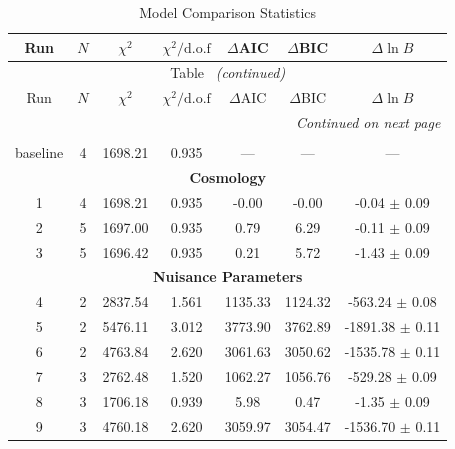 \clearpage
\onecolumngrid
\begin{longtable}{c c c c c c c}
    \caption{Model Comparison Statistics} \label{tab:bic} \\
    \hline
    \hline
    Run & $N$ & $\chi^2$ & $\chi^2/\mathrm{d.o.f}$ & $\Delta$AIC & $\Delta$BIC & $\Delta\ln B$ \\
    \hline
    \hline
    \endfirsthead
    \multicolumn{7}{c}{Table~\thetable{} \emph{(continued)}} \\
    \hline
    \hline
    Run & $N$ & $\chi^2$ & $\chi^2/\mathrm{d.o.f}$ & $\Delta$AIC & $\Delta$BIC & $\Delta\ln B$ \\
    \hline
    \hline
    \endhead
    \hline
    \multicolumn{7}{r}{\emph{Continued on next page}} \\
    \endfoot
    \hline
    \endlastfoot
    \multicolumn{7}{c}{\textbf{Baseline}} \\
    \hline
    baseline & 4 & 1698.21 & 0.935 & --- & --- & --- \\
    \hline
    \multicolumn{7}{c}{\textbf{Cosmology}} \\
    \hline
    1 & 4 & 1698.21 & 0.935 & -0.00 & -0.00 & -0.04 $\pm$ 0.09 \\
    2 & 5 & 1697.00 & 0.935 & 0.79 & \cellcolor{aiclightred}6.29 & -0.11 $\pm$ 0.09 \\
    3 & 5 & 1696.42 & 0.935 & 0.21 & \cellcolor{aicorange}5.72 & \cellcolor{aicorange}-1.43 $\pm$ 0.09 \\
    \hline
    \multicolumn{7}{c}{\textbf{Nuisance Parameters}} \\
    \hline
    4 & 2 & 2837.54 & 1.561 & \cellcolor{aicred}1135.33 & \cellcolor{aicred}1124.32 & \cellcolor{aicred}-563.24 $\pm$ 0.08 \\
    5 & 2 & 5476.11 & 3.012 & \cellcolor{aicred}3773.90 & \cellcolor{aicred}3762.89 & \cellcolor{aicred}-1891.38 $\pm$ 0.11 \\
    6 & 2 & 4763.84 & 2.620 & \cellcolor{aicred}3061.63 & \cellcolor{aicred}3050.62 & \cellcolor{aicred}-1535.78 $\pm$ 0.11 \\
    7 & 3 & 2762.48 & 1.520 & \cellcolor{aicred}1062.27 & \cellcolor{aicred}1056.76 & \cellcolor{aicred}-529.28 $\pm$ 0.09 \\
    8 & 3 & 1706.18 & 0.939 & \cellcolor{aicorange}5.98 & 0.47 & \cellcolor{aicorange}-1.35 $\pm$ 0.09 \\
    9 & 3 & 4760.18 & 2.620 & \cellcolor{aicred}3059.97 & \cellcolor{aicred}3054.47 & \cellcolor{aicred}-1536.70 $\pm$ 0.11 \\

\end{longtable}
